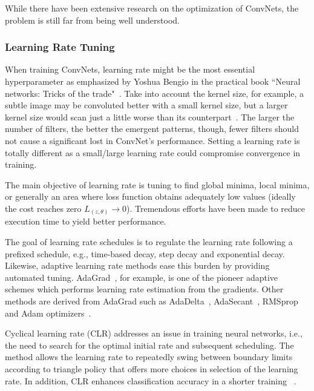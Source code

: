 \documentclass{ieeeaccess}
\begin{document}
While there have been extensive research on the optimization of ConvNets, the problem is still far from being well understood.
\subsubsection{Learning Rate Tuning}
\label{sec:learningrateworks}
When training ConvNets, learning rate might be the most essential hyperparameter as emphasized by Yoshua Bengio in the practical book ``Neural networks: Tricks of the trade"~\cite{bengio2012practical}. Take into account the kernel size, for example, a subtle image may be convoluted better with a small kernel size, but a larger kernel size would scan just a little worse than its counterpart~\cite{tomen2021spectral}. The larger the number of filters, the better the emergent patterns, though, fewer filters should not cause a significant lost in ConvNet's performance. Setting a learning rate is totally different as a small/large learning rate could compromise convergence in training.

The main objective of learning rate is tuning to find global minima, local minima, or generally an area where loss function obtains adequately low values (ideally the cost reaches zero $L_{(z,\theta)} \rightarrow 0$). Tremendous efforts have been made to reduce execution time to yield better performance.

The goal of learning rate schedules is to regulate the learning rate following a prefixed schedule, e.g., time-based decay, step decay and exponential decay. Likewise, adaptive learning rate methods ease this burden by providing automated tuning. AdaGrad~\cite{duchi2011adaptive}, for example, is one of the pioneer adaptive schemes which performs learning rate estimation from the gradients. Other methods are derived from AdaGrad such as AdaDelta~\cite{zeiler2012adadelta}, AdaSecant~\cite{gulcehre2014adasecant}, RMSprop~\cite{tieleman2012lecture} and Adam optimizers~\cite{kingma2014adam}. 




Cyclical learning rate (CLR) addresses an issue in training neural networks, i.e., the need to search for the optimal initial rate and subsequent scheduling. The method allows the learning rate to repeatedly swing between boundary limits according to triangle policy that offers more choices in selection of the learning rate. In addition, CLR enhances classification accuracy in a shorter training ~\cite{smith2017cyclical}.
\end{document}
